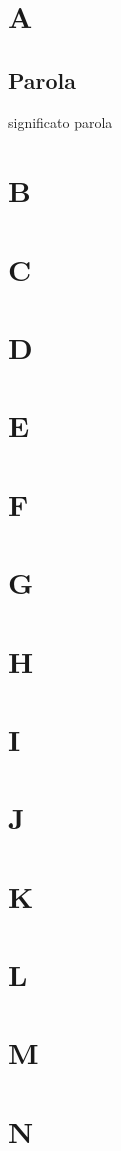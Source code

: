 \newpage \section{A}
\subsection{Parola} significato parola
\newpage \section{B}
\newpage \section{C}
\newpage \section{D}
\newpage \section{E}
\newpage \section{F}
\newpage \section{G}
\newpage \section{H}
\newpage \section{I}
\newpage \section{J}
\newpage \section{K}
\newpage \section{L}
\newpage \section{M}
\newpage \section{N}
